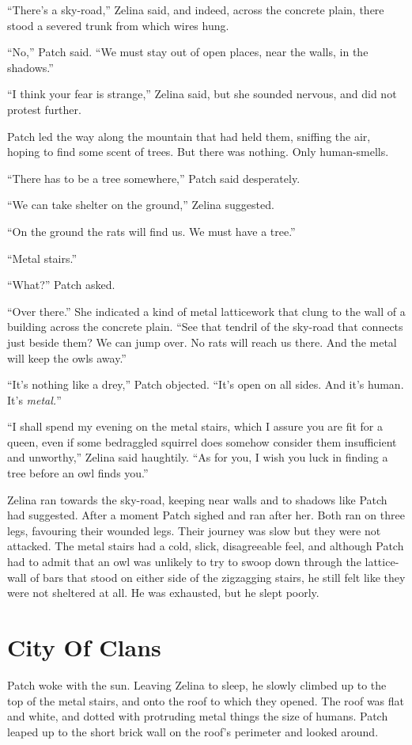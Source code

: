 \documentclass[ebook,oneside,openany,17pt]{memoir}
\newenvironment{tolerant}[1]{%
  \par\tolerance=#1\relax
}{%
  \par
}
\renewcommand{\thechapter}{\Roman{chapter}}
\newcounter{sections}
\newcommand{\sections}[1]{%
  \section*{#1}
  \addtocounter{sections}{1}%
  \pdfbookmark[1]{#1}{section.\thechapter.\thesections}}
\begin{document}
\begin{tolerant}{2000}
“There’s a sky-road,” Zelina said, and indeed, across the concrete
plain, there stood a severed trunk from which wires hung.
\end{tolerant}

“No,” Patch said. “We must stay out of open places, near the walls, in
the shadows.”

“I think your fear is strange,” Zelina said, but she sounded nervous,
and did not protest further.

Patch led the way along the mountain that had held them, sniffing the
air, hoping to find some scent of trees. But there was nothing. Only
human-smells.

“There has to be a tree somewhere,” Patch said desperately.

“We can take shelter on the ground,” Zelina suggested.

“On the ground the rats will find us. We must have a tree.”

“Metal stairs.”

“What?” Patch asked.

“Over there.” She indicated a kind of metal latticework that clung to
the wall of a building across the concrete plain. “See that tendril of
the sky-road that connects just beside them? We can jump over. No rats
will reach us there. And the metal will keep the owls away.”

“It’s nothing like a drey,” Patch objected. “It’s open on all
sides. And it’s human. It’s \emph{metal.}”

“I shall spend my evening on the metal stairs, which I assure you are
fit for a queen, even if some bedraggled squirrel does somehow
consider them insufficient and unworthy,” Zelina said haughtily. “As
for you, I wish you luck in finding a tree before an owl finds you.”

Zelina ran towards the sky-road, keeping near walls and to shadows
like Patch had suggested. After a moment Patch sighed and ran after
her. Both ran on three legs, favouring their wounded legs. Their
journey was slow but they were not attacked. The metal stairs had a
cold, slick, disagreeable feel, and although Patch had to admit that
an owl was unlikely to try to swoop down through the lattice-wall of
bars that stood on either side of the zigzagging stairs, he still felt
like they were not sheltered at all. He was exhausted, but he slept
poorly.


\sections{City Of Clans}

Patch woke with the sun. Leaving Zelina to sleep, he slowly climbed up
to the top of the metal stairs, and onto the roof to which they
opened. The roof was flat and white, and dotted with protruding metal
things the size of humans. Patch leaped up to the short brick wall on
the roof’s perimeter and looked around.
\end{document}
